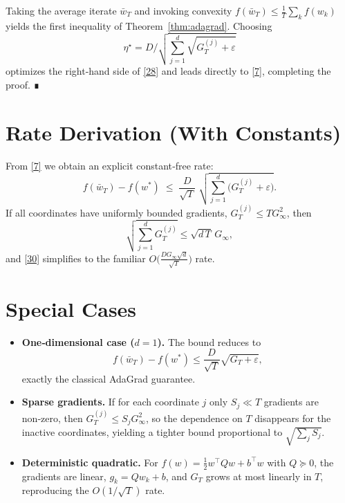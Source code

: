 \documentclass{article}
\begin{document}
Taking the average iterate $\bar w_{T}$ and invoking convexity
$f(\bar w_{T})\le \frac{1}{T}\sum_{k}f(w_{k})$ yields the first inequality of
Theorem~\ref{thm:adagrad}. Choosing
\[
\eta^{\star}= D\Big/\sqrt{\sum_{j=1}^{d}\sqrt{G_{T}^{(j)}+\varepsilon}}
\tag{29}
\]
optimizes the right‑hand side of \eqref{28} and leads directly to
\eqref{7}, completing the proof. ∎

\section*{Rate Derivation (With Constants)}
From \eqref{7} we obtain an explicit constant‑free rate:
\[
f(\bar w_{T})-f(w^{\ast})
\;\le\;
\frac{D}{\sqrt{T}}\;
\sqrt{\sum_{j=1}^{d}\bigl(G_{T}^{(j)}+\varepsilon\bigr)}.
\tag{30}
\]
If all coordinates have uniformly bounded gradients,
$G_{T}^{(j)}\le T G_{\infty}^{2}$, then
\[
\sqrt{\sum_{j=1}^{d} G_{T}^{(j)}}
\le \sqrt{d\,T}\,G_{\infty},
\]
and \eqref{30} simplifies to the familiar $O\!\bigl(\tfrac{DG_{\infty}\sqrt{d}}{\sqrt{T}}\bigr)$
rate.

\section*{Special Cases}
\begin{itemize}
\item \textbf{One‑dimensional case ($d=1$).} The bound reduces to
\[
f(\bar w_{T})-f(w^{\ast})
\le \frac{D}{\sqrt{T}}\sqrt{G_{T}+ \varepsilon},
\]
exactly the classical AdaGrad guarantee.
\item \textbf{Sparse gradients.} If for each coordinate $j$ only
$S_{j}\ll T$ gradients are non‑zero, then $G_{T}^{(j)}\le S_{j}G_{\infty}^{2}$,
so the dependence on $T$ disappears for the inactive coordinates,
yielding a tighter bound proportional to $\sqrt{\sum_{j}S_{j}}$.
\item \textbf{Deterministic quadratic.} For $f(w)=\tfrac12 w^{\top}Qw+b^{\top}w$ with $Q\succeq 0$,
the gradients are linear, $g_{k}=Qw_{k}+b$, and $G_{T}$ grows at most linearly
in $T$, reproducing the $O(1/\sqrt{T})$ rate.
\end{itemize}

\end{document}
